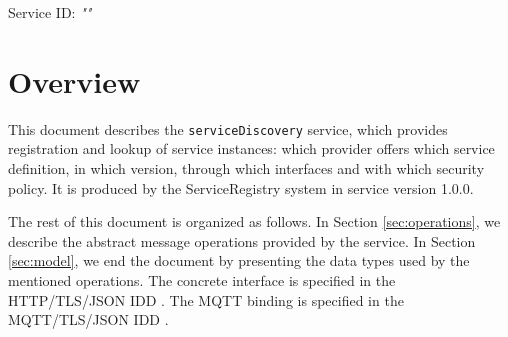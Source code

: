 \documentclass[a4paper]{arrowhead}
\begin{document}
\sloppy

\ArrowheadSetup

\begin{center}
  \vspace*{1cm}
  \huge{\arrowtitle}

  \vspace*{0.2cm}
  \LARGE{\arrowtype}
  \vspace*{1cm}

  \Large{Service ID: \textit{"\arrowid"}}

  \vspace*{\fill}


  \vspace*{1cm}
  \vspace*{\fill}

  \begin{abstract}
    This document describes the \texttt{serviceDiscovery} service, version 1.0.0, produced by the ServiceRegistry core system of Arrowhead 5.2.2.
  \end{abstract}

  \vspace*{1cm}
\end{center}

\newpage

\tableofcontents
\newpage

\section{Overview}
\label{sec:overview}

This document describes the \texttt{serviceDiscovery} service, which provides registration and lookup of service instances: which provider offers which service definition, in which version, through which interfaces and with which security policy.
It is produced by the ServiceRegistry system \cite{sr-sysd} in service version 1.0.0.

The rest of this document is organized as follows.
In Section \ref{sec:operations}, we describe the abstract message operations provided by the service.
In Section \ref{sec:model}, we end the document by presenting the data types used by the mentioned operations.
The concrete interface is specified in the HTTP/TLS/JSON IDD \cite{sr-serviceDiscovery-http-idd}. The MQTT binding is specified in the MQTT/TLS/JSON IDD \cite{sr-serviceDiscovery-mqtt-idd}.
\end{document}
